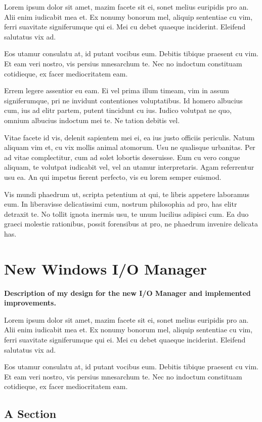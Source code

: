 \documentclass[a4paper,11pt,oneside]{report}
\begin{document}
Lorem ipsum dolor sit amet, mazim facete sit ei, sonet melius euripidis pro
an. Alii enim iudicabit mea et. Ex nonumy bonorum mel, aliquip sententiae cu
vim, ferri suavitate signiferumque qui ei. Mei cu debet quaeque
inciderint. Eleifend salutatus vix ad.

Eos utamur consulatu at, id putant vocibus eum. Debitis tibique praesent cu
vim. Et eam veri nostro, vis persius mnesarchum te. Nec no indoctum constituam
cotidieque, ex facer mediocritatem eam.

Errem legere assentior eu eam. Ei vel prima illum timeam, vim in assum
signiferumque, pri ne invidunt contentiones voluptatibus. Id homero albucius
cum, ius ad elitr partem, putent tincidunt cu ius. Iudico volutpat ne quo,
omnium albucius indoctum mei te. Ne tation debitis vel.

Vitae facete id vis, delenit sapientem mei ei, ea ius justo officiis
periculis. Natum aliquam vim et, cu vix mollis animal atomorum. Usu ne qualisque
urbanitas. Per ad vitae complectitur, cum ad solet lobortis deseruisse. Eum cu
vero congue aliquam, te volutpat iudicabit vel, vel an utamur
interpretaris. Agam referrentur usu ea. An qui impetus fierent perfecto, vis eu
lorem semper euismod.

Vis mundi phaedrum ut, scripta petentium at qui, te libris appetere laboramus
eum. In liberavisse delicatissimi cum, nostrum philosophia ad pro, has elitr
detraxit te. No tollit ignota inermis usu, te unum lucilius adipisci cum. Ea duo
graeci molestie rationibus, possit forensibus at pro, ne phaedrum invenire
delicata has.


\chapter{New Windows I/O Manager}

\textbf{Description of my design for the new I/O Manager and implemented
  improvements.}

Lorem ipsum dolor sit amet, mazim facete sit ei, sonet melius euripidis pro
an. Alii enim iudicabit mea et. Ex nonumy bonorum mel, aliquip sententiae cu
vim, ferri suavitate signiferumque qui ei. Mei cu debet quaeque
inciderint. Eleifend salutatus vix ad.

Eos utamur consulatu at, id putant vocibus eum. Debitis tibique praesent cu
vim. Et eam veri nostro, vis persius mnesarchum te. Nec no indoctum constituam
cotidieque, ex facer mediocritatem eam.


\section{A Section}
\end{document}
